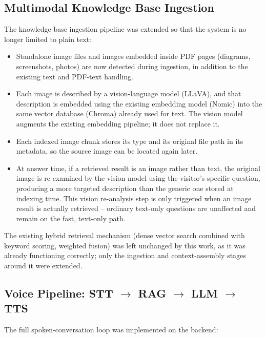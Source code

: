 \documentclass[11pt,a4paper]{article}
\begin{document}
\subsection{Multimodal Knowledge Base Ingestion}

The knowledge-base ingestion pipeline was extended so that the system is no longer limited to plain text:

\begin{itemize}
    \item Standalone image files and images embedded inside PDF pages (diagrams, screenshots, photos) are now detected during ingestion, in addition to the existing text and PDF-text handling.
    \item Each image is described by a vision-language model (LLaVA), and that description is embedded using the existing embedding model (Nomic) into the same vector database (Chroma) already used for text. The vision model augments the existing embedding pipeline; it does not replace it.
    \item Each indexed image chunk stores its type and its original file path in its metadata, so the source image can be located again later.
    \item At answer time, if a retrieved result is an image rather than text, the original image is re-examined by the vision model using the visitor's specific question, producing a more targeted description than the generic one stored at indexing time. This vision re-analysis step is only triggered when an image result is actually retrieved -- ordinary text-only questions are unaffected and remain on the fast, text-only path.
\end{itemize}

The existing hybrid retrieval mechanism (dense vector search combined with keyword scoring, weighted fusion) was left unchanged by this work, as it was already functioning correctly; only the ingestion and context-assembly stages around it were extended.

\subsection{Voice Pipeline: STT $\rightarrow$ RAG $\rightarrow$ LLM $\rightarrow$ TTS}

The full spoken-conversation loop was implemented on the backend:
\end{document}
